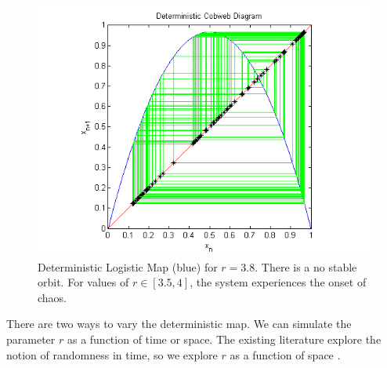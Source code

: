 \documentclass[12pt]{article}
\begin{document}
\begin{figure}[H]
	\begin{center}
		\includegraphics[scale=0.7]{chaos}
\caption{Deterministic Logistic Map (blue) for $r=3.8$. There is a no
  stable orbit. For values of $r \in [3.5,4]$, the system experiences the onset of
chaos.}
	\end{center}
\end{figure}
There are two ways to vary the deterministic map. We can simulate the
parameter $r$ as a function of time or space. The existing literature
explore the notion of randomness in time, so we explore $r$ as a
function of space \cite{athreya}.
\end{document}
